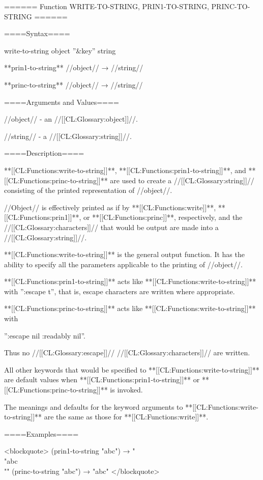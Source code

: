 ====== Function WRITE-TO-STRING, PRIN1-TO-STRING, PRINC-TO-STRING ======

====Syntax====

\DefunWithValuesNewline write-to-string {object ''&key'' \writekeys{}} {string}

**prin1-to-string** //object// → //string//

**princ-to-string** //object// → //string//

====Arguments and Values====

//object// - an //[[CL:Glossary:object]]//.

\writekeydescriptions{}

//string// - a //[[CL:Glossary:string]]//.

====Description====

**[[CL:Functions:write-to-string]]**, **[[CL:Functions:prin1-to-string]]**, and **[[CL:Functions:princ-to-string]]** are used to create a //[[CL:Glossary:string]]// consisting of the printed representation of //object//.

//Object// is effectively printed as if by **[[CL:Functions:write]]**, **[[CL:Functions:prin1]]**, or **[[CL:Functions:princ]]**, respectively, and the //[[CL:Glossary:characters]]// that would be output are made into a //[[CL:Glossary:string]]//.

**[[CL:Functions:write-to-string]]** is the general output function. It has the ability to specify all the parameters applicable to the printing of //object//.

**[[CL:Functions:prin1-to-string]]** acts like **[[CL:Functions:write-to-string]]** with '':escape t'', that is, escape characters are written where appropriate.

**[[CL:Functions:princ-to-string]]** acts like **[[CL:Functions:write-to-string]]** with

'':escape nil :readably nil''.

Thus no //[[CL:Glossary:escape]]// //[[CL:Glossary:characters]]// are written.

All other keywords that would be specified to **[[CL:Functions:write-to-string]]** are default values when **[[CL:Functions:prin1-to-string]]** or **[[CL:Functions:princ-to-string]]** is invoked.

The meanings and defaults for the keyword arguments to **[[CL:Functions:write-to-string]]** are the same as those for **[[CL:Functions:write]]**.

====Examples====

<blockquote> (prin1-to-string "abc") → "\\"abc\\"" (princ-to-string "abc") → "abc" </blockquote>

